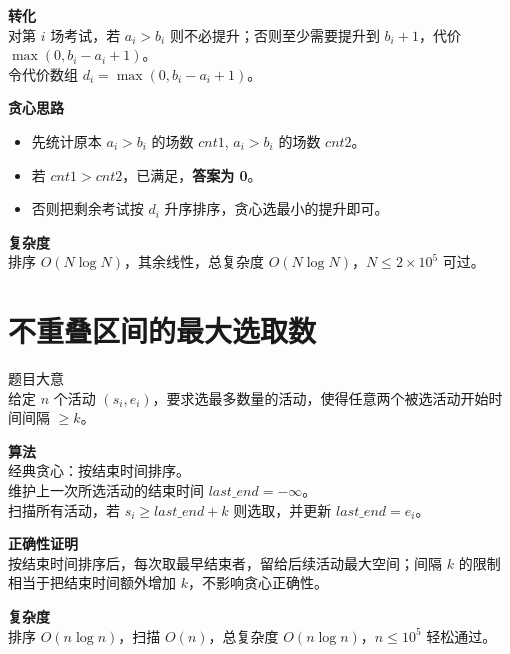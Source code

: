 \documentclass[11pt]{beamer}
\begin{document}
\begin{frame}
\textbf{转化}\\
对第 $i$ 场考试，若 $a_i>b_i$ 则不必提升；否则至少需要提升到 $b_i+1$，代价 $\max(0,b_i-a_i+1)$。\\
令代价数组 $d_i=\max(0,b_i-a_i+1)$。
\end{frame}

\begin{frame}
\textbf{贪心思路}\\
\begin{itemize}
  \item 先统计原本 $a_i>b_i$ 的场数 $cnt1$,  $a_i>b_i$ 的场数 $cnt2$。
  \item 若 $cnt1>cnt2$，已满足，\textbf{答案为 0}。
  \item 否则把剩余考试按 $d_i$ 升序排序，贪心选最小的提升即可。
\end{itemize}
\end{frame}

\begin{frame}
\textbf{复杂度}\\
排序 $O(N\log N)$，其余线性，总复杂度 $O(N\log N)$，$N\le 2\times10^5$ 可过。
\end{frame}

\section{不重叠区间的最大选取数}
\begin{frame}
题目大意\\
给定 $n$ 个活动 $(s_i,e_i)$，要求选最多数量的活动，使得任意两个被选活动开始时间间隔 $\ge k$。
\end{frame}

\begin{frame}
\textbf{算法}\\
经典贪心：按结束时间排序。\\
维护上一次所选活动的结束时间 $last\_end=-\infty$。\\
扫描所有活动，若 $s_i\ge last\_end+k$ 则选取，并更新 $last\_end=e_i$。
\end{frame}

\begin{frame}
\textbf{正确性证明}\\
按结束时间排序后，每次取最早结束者，留给后续活动最大空间；间隔 $k$ 的限制相当于把结束时间额外增加 $k$，不影响贪心正确性。
\end{frame}

\begin{frame}
\textbf{复杂度}\\
排序 $O(n\log n)$，扫描 $O(n)$，总复杂度 $O(n\log n)$，$n\le 10^5$ 轻松通过。
\end{frame}
\end{document}
